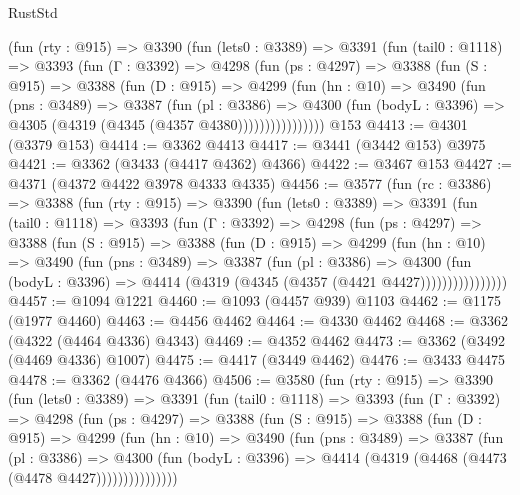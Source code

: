 \begin{lexlean}{RustStd}
\begin{coremodule}
        (fun (rty : @915) =>
        @3390
          (fun (lets0 : @3389) =>
          @3391
            (fun (tail0 : @1118) =>
            @3393
              (fun (Γ : @3392) =>
              @4298
                (fun (ps : @4297) =>
                @3388
                  (fun (S : @915) =>
                  @3388
                    (fun (D : @915) =>
                    @4299
                      (fun (hn : @10) =>
                      @3490
                        (fun (pns : @3489) =>
                        @3387
                          (fun (pl : @3386) =>
                          @4300
                            (fun (bodyL : @3396) => @4305 (@4319 (@4345 (@4357 @4380))))))))))))))))
    @153
@4413 := @4301 (@3379 @153)
@4414 := @3362 @4413
@4417 := @3441 (@3442 @153) @3975
@4421 := @3362 (@3433 (@4417 @4362) @4366)
@4422 := @3467 @153
@4427 := @4371 (@4372 @4422 @3978 @4333 @4335)
@4456 := @3577
    (fun (rc : @3386) =>
    @3388
      (fun (rty : @915) =>
      @3390
        (fun (lets0 : @3389) =>
        @3391
          (fun (tail0 : @1118) =>
          @3393
            (fun (Γ : @3392) =>
            @4298
              (fun (ps : @4297) =>
              @3388
                (fun (S : @915) =>
                @3388
                  (fun (D : @915) =>
                  @4299
                    (fun (hn : @10) =>
                    @3490
                      (fun (pns : @3489) =>
                      @3387
                        (fun (pl : @3386) =>
                        @4300
                          (fun (bodyL : @3396) =>
                          @4414 (@4319 (@4345 (@4357 (@4421 @4427))))))))))))))))
@4457 := @1094 @1221
@4460 := @1093 (@4457 @939) @1103
@4462 := @1175 (@1977 @4460)
@4463 := @4456 @4462
@4464 := @4330 @4462
@4468 := @3362 (@4322 (@4464 @4336) @4343)
@4469 := @4352 @4462
@4473 := @3362 (@3492 (@4469 @4336) @1007)
@4475 := @4417 (@3449 @4462)
@4476 := @3433 @4475
@4478 := @3362 (@4476 @4366)
@4506 := @3580
    (fun (rty : @915) =>
    @3390
      (fun (lets0 : @3389) =>
      @3391
        (fun (tail0 : @1118) =>
        @3393
          (fun (Γ : @3392) =>
          @4298
            (fun (ps : @4297) =>
            @3388
              (fun (S : @915) =>
              @3388
                (fun (D : @915) =>
                @4299
                  (fun (hn : @10) =>
                  @3490
                    (fun (pns : @3489) =>
                    @3387
                      (fun (pl : @3386) =>
                      @4300
                        (fun (bodyL : @3396) =>
                        @4414 (@4319 (@4468 (@4473 (@4478 @4427)))))))))))))))

\end{coremodule}
\end{lexlean}
